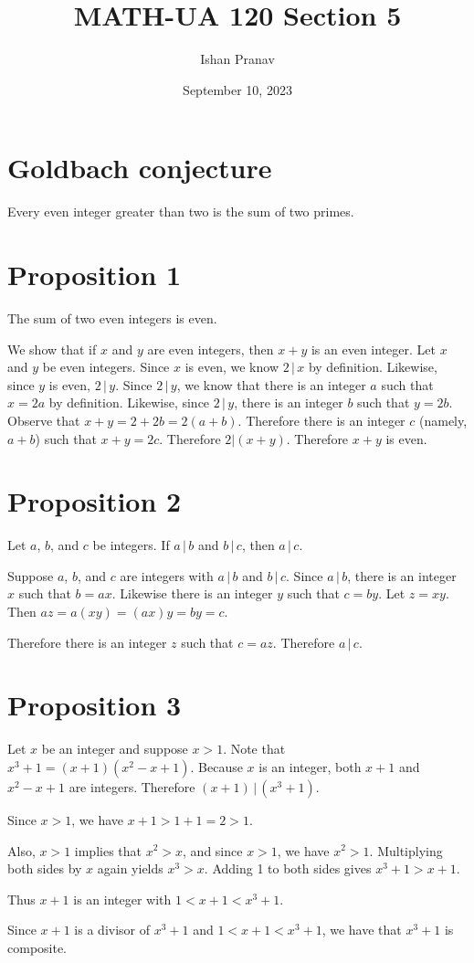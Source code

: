 \documentclass[12pt]{article}
\title{MATH-UA 120 Section 5}
\author{Ishan Pranav}
\date{September 10, 2023}
\begin{document}
\maketitle
\section*{Goldbach conjecture}
Every even integer greater than two is the sum of two primes.
\section*{Proposition 1}
The sum of two even integers is even.

We show that if $x$ and $y$ are even integers, then $x+y$ is an even integer. Let $x$ and $y$ be even integers. Since $x$ is even, we know $2\,|\,x$ by definition. Likewise, since $y$ is even, $2\,|\,y$. Since $2\,|\,y$, we know that there is an integer $a$ such that $x=2a$ by definition. Likewise, since $2\,|\,y$, there is an integer $b$ such that $y=2b$. Observe that $x+y=2+2b=2(a+b)$. Therefore there is an integer $c$ (namely, $a+b$) such that $x+y=2c$. Therefore $2|(x+y)$. Therefore $x+y$ is even.
\section*{Proposition 2}
Let $a$, $b$, and $c$ be integers. If $a\,|\,b$ and $b\,|\,c$, then $a\,|\,c$.

Suppose $a$, $b$, and $c$ are integers with $a\,|\,b$ and $b\,|\,c$. Since $a\,|\,b$, there is an integer $x$ such that $b=ax$. Likewise there is an integer $y$ such that $c=by$. Let $z=xy$. Then $az=a(xy)=(ax)y=by=c$.

Therefore there is an integer $z$ such that $c=az$. Therefore $a\,|\,c$.
\section*{Proposition 3}
Let $x$ be an integer and suppose $x>1$. Note that $x^3+1=(x+1)(x^2-x+1)$. Because $x$ is an integer, both $x+1$ and $x^2-x+1$ are integers. Therefore $(x+1)\,|\,(x^3+1)$.

Since $x>1$, we have $x+1>1+1=2>1$.

Also, $x>1$ implies that $x^2>x$, and since $x>1$, we have $x^2>1$. Multiplying both sides by $x$ again yields $x^3>x$. Adding 1 to both sides gives $x^3+1>x+1$.

Thus $x+1$ is an integer with $1<x+1<x^3+1$.

Since $x+1$ is a divisor of $x^3+1$ and $1<x+1<x^3+1$, we have that $x^3+1$ is composite.
\end{document}
